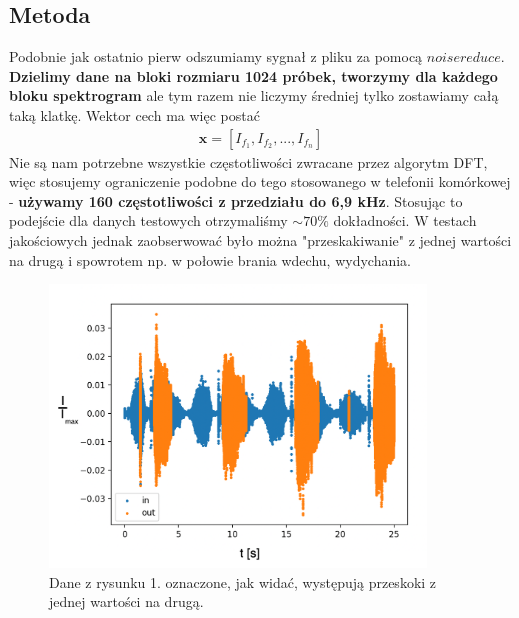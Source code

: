 \documentclass[polish]{article}
\begin{document}
\subsection{Metoda}
Podobnie jak ostatnio pierw odszumiamy sygnał z pliku za pomocą $noisereduce$. \textbf{Dzielimy dane na bloki
rozmiaru 1024 próbek, tworzymy dla każdego bloku spektrogram} ale tym razem nie liczymy średniej tylko zostawiamy całą taką klatkę. Wektor cech ma więc postać 
\begin{gather*}
\boldsymbol{x} = [I_{f_1}, I_{f_2}, ..., I_{f_n}]
\end{gather*}
Nie są nam 
potrzebne wszystkie częstotliwości zwracane przez algorytm DFT, więc stosujemy ograniczenie podobne
do tego stosowanego w telefonii komórkowej -  \textbf{używamy 160 częstotliwości z przedziału do 6,9 kHz}.
Stosując to podejście dla danych testowych otrzymaliśmy $\sim 70\%$ dokładności. W testach
jakościowych jednak zaobserwować było można "przeskakiwanie" z jednej
wartości na drugą i spowrotem np. w połowie brania wdechu, wydychania.
\begin{figure}[H]
	\centering
	\includegraphics[width=10cm]{przeskakiwanie_ozn}
  	\caption{Dane z rysunku 1. oznaczone, jak widać, występują przeskoki z jednej wartości na drugą.}
\end{figure}
\end{document}
